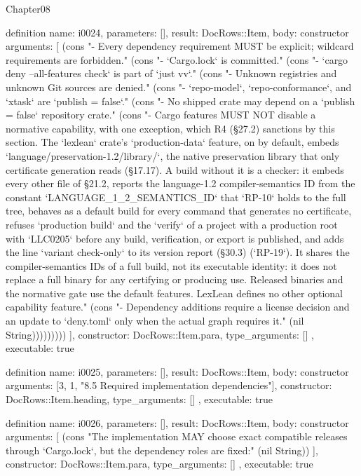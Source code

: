 \begin{lexlean}{Chapter08}
\begin{semanticmodule}
definition{
  name: i0024,
  parameters: [],
  result: DocRows::Item,
  body: constructor{
    arguments: [
      (cons "- Every dependency requirement MUST be explicit; wildcard requirements are forbidden." (cons "- `Cargo.lock` is committed." (cons "- `cargo deny --all-features check` is part of `just vv`." (cons "- Unknown registries and unknown Git sources are denied." (cons "- `repo-model`, `repo-conformance`, and `xtask` are `publish = false`." (cons "- No shipped crate may depend on a `publish = false` repository crate." (cons "- Cargo features MUST NOT disable a normative capability, with one exception, which R4 (§27.2) sanctions by this section. The `lexlean` crate's `production-data` feature, on by default, embeds `language/preservation-1.2/library/`, the native preservation library that only certificate generation reads (§17.17). A build without it is a checker: it embeds every other file of §21.2, reports the language-1.2 compiler-semantics ID from the constant `LANGUAGE_1_2_SEMANTICS_ID` that `RP-10` holds to the full tree, behaves as a default build for every command that generates no certificate, refuses `production build` and the `verify` of a project with a production root with `LLC0205` before any build, verification, or export is published, and adds the line `variant check-only` to its version report (§30.3) (`RP-19`). It shares the compiler-semantics IDs of a full build, not its executable identity: it does not replace a full binary for any certifying or producing use. Released binaries and the normative gate use the default features. LexLean defines no other optional capability feature." (cons "- Dependency additions require a license decision and an update to `deny.toml` only when the actual graph requires it." (nil String)))))))))
    ],
    constructor: DocRows::Item.para,
    type_arguments: []
  },
  executable: true
}

definition{
  name: i0025,
  parameters: [],
  result: DocRows::Item,
  body: constructor{
    arguments: [3, 1, "8.5 Required implementation dependencies"],
    constructor: DocRows::Item.heading,
    type_arguments: []
  },
  executable: true
}

definition{
  name: i0026,
  parameters: [],
  result: DocRows::Item,
  body: constructor{
    arguments: [
      (cons "The implementation MAY choose exact compatible releases through `Cargo.lock`, but the dependency roles are fixed:" (nil String))
    ],
    constructor: DocRows::Item.para,
    type_arguments: []
  },
  executable: true
}


\end{semanticmodule}
\end{lexlean}
